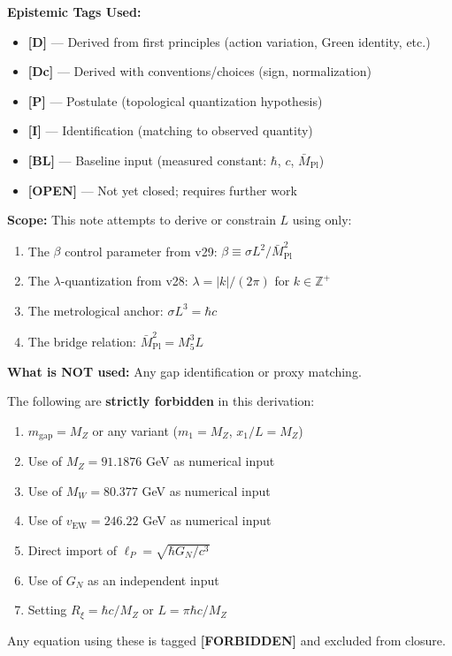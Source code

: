 \documentclass[11pt,a4paper]{article}
\begin{document}
\begin{readercontract}
\textbf{Epistemic Tags Used:}
\begin{itemize}
  \item \textbf{[D]} — Derived from first principles (action variation, Green identity, etc.)
  \item \textbf{[Dc]} — Derived with conventions/choices (sign, normalization)
  \item \textbf{[P]} — Postulate (topological quantization hypothesis)
  \item \textbf{[I]} — Identification (matching to observed quantity)
  \item \textbf{[BL]} — Baseline input (measured constant: $\hbar$, $c$, $\bar{M}_{\text{Pl}}$)
  \item \textbf{[OPEN]} — Not yet closed; requires further work
\end{itemize}

\textbf{Scope:} This note attempts to derive or constrain $L$ using only:
\begin{enumerate}
  \item The $\beta$ control parameter from v29: $\beta \equiv \sigma L^2 / \bar{M}_{\text{Pl}}^2$
  \item The $\lambda$-quantization from v28: $\lambda = |k|/(2\pi)$ for $k \in \mathbb{Z}^+$
  \item The metrological anchor: $\sigma L^3 = \hbar c$
  \item The bridge relation: $\bar{M}_{\text{Pl}}^2 = M_5^3 L$
\end{enumerate}

\textbf{What is NOT used:} Any gap identification or proxy matching.
\end{readercontract}

\begin{noidentbox}
The following are \textbf{strictly forbidden} in this derivation:
\begin{enumerate}
  \item $m_{\text{gap}} = M_Z$ or any variant ($m_1 = M_Z$, $x_1/L = M_Z$)
  \item Use of $M_Z = 91.1876$ GeV as numerical input
  \item Use of $M_W = 80.377$ GeV as numerical input
  \item Use of $v_{\text{EW}} = 246.22$ GeV as numerical input
  \item Direct import of $\ell_P = \sqrt{\hbar G_N/c^3}$
  \item Use of $G_N$ as an independent input
  \item Setting $R_\xi = \hbar c / M_Z$ or $L = \pi\hbar c / M_Z$
\end{enumerate}
Any equation using these is tagged \textbf{[FORBIDDEN]} and excluded from closure.
\end{noidentbox}
\end{document}
